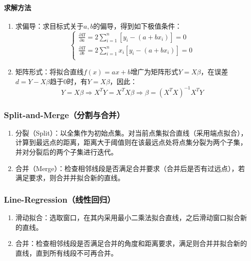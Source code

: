 \documentclass[
12pt, %
a4paper, 
oneside, %
headinclude,footinclude, %
]{scrartcl}
\begin{document}
\paragraph{求解方法}
\begin{enumerate}
\item 求偏导：求目标式关于$ a, b $的偏导，得到如下极值条件：
$$
\begin{cases}
\frac{\partial \Pi}{\partial a} = 2 \sum_{i = 1}^{n} [y_i - (a + bx_i)] = 0 \\
\frac{\partial \Pi}{\partial b} = 2 \sum_{i = 1}^{n} x_i [y_i - (a + bx_i)] = 0 \\
\end{cases}
$$
\item 矩阵形式：将拟合直线$ f(x) = ax + b $增广为矩阵形式$ Y = X\beta $，在误差$ d = Y - X\beta $趋于$ 0 $时，有$ Y = X\beta $，因此：
$$ Y = X\beta \Rightarrow X^T Y = X^T X\beta \Rightarrow \beta = (X^T X)^{-1}X^T Y $$
\end{enumerate}
\subsubsection[Split-and-Merge]{Split-and-Merge（分割与合并）}
\begin{enumerate}
\item 分裂（Split）：以全集作为初始点集。对当前点集拟合直线（采用端点拟合），计算到最远点的距离，距离大于阈值则在该最远点处将点集分裂为两个子集，并对分裂后的两个子集进行迭代。
\item 合并（Merge）：检查相邻线段是否满足合并要求（合并后是否有过远点），若满足要求，则合并并拟合新的直线。
\end{enumerate}
\subsubsection[Line-Regression]{Line-Regression（线性回归）}
\begin{enumerate}
\item 滑动拟合：选取窗口，在其内采用最小二乘法拟合直线，之后滑动窗口拟合新的直线。
\item 合并：检查相邻线段是否满足合并的角度和距离要求，满足则合并并拟合新的直线，直到所有线段不可再合并。
\end{enumerate}
\end{document}
